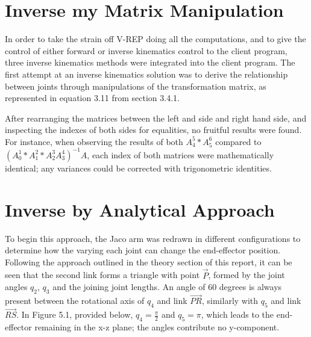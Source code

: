 \documentclass[12pt,openany,a4paper]{book}
\begin{document}
\section{Inverse my Matrix Manipulation}
In order to take the strain off V-REP doing all the computations, and to give the control of either forward or inverse kinematics control to the client program, three inverse kinematics methods were integrated into the client program. The first attempt at an inverse kinematics solution was to derive the relationship between joints through manipulations of the transformation matrix, as represented in equation 3.11 from section 3.4.1.
%

After rearranging the matrices between the left and side and right hand side, and inspecting the indexes of both sides for equalities, no fruitful results were found. For instance, when observing the results of both $A_4^5 * A_5^6$ compared to $(A_0^1 * A_1^2 * A_2^3 A_3^4)^{-1} A$, each index of both matrices were mathematically identical; any variances could be corrected with trigonometric identities. 
\clearpage

\section{Inverse by Analytical Approach}

To begin this approach, the Jaco arm was redrawn in different configurations to determine how the varying each joint can change the end-effector position. Following the approach outlined in the theory section of this report, it can be seen that the second link forms a triangle with point $\vec{P}$, formed by the joint angles $q_2$, $q_3$ and the joining joint lengths. An angle of 60 degrees is always present between the rotational axis of $q_4$ and link $\vec{PR}$, similarly with $q_5$ and link $\vec{RS}$. In Figure 5.1, provided below, $q_4 = \frac{\pi}{2}$ and $q_5 = \pi$, which leads to the end-effector remaining in the x-z plane; the angles contribute no y-component. 
\end{document}

